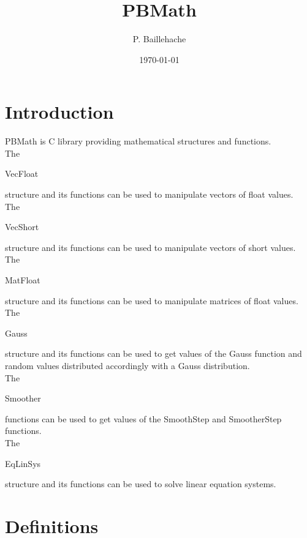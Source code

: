 \documentclass[12pt, a4paper]{article}
\begin{document}
\title{PBMath}
\author{P. Baillehache}
\date{\today}
\maketitle

\tableofcontents

\section*{Introduction}

PBMath is C library providing mathematical structures and functions.\\ 

The \begin{ttfamily}VecFloat\end{ttfamily} structure and its functions can be used to manipulate vectors of float values.\\

The \begin{ttfamily}VecShort\end{ttfamily} structure and its functions can be used to manipulate vectors of short values.\\

The \begin{ttfamily}MatFloat\end{ttfamily} structure and its functions can be used to manipulate matrices of float values.\\

The \begin{ttfamily}Gauss\end{ttfamily} structure and its functions can be used to get values of the Gauss function and random values distributed accordingly with a Gauss distribution.\\

The \begin{ttfamily}Smoother\end{ttfamily} functions can be used to get values of the SmoothStep and SmootherStep functions.\\

The \begin{ttfamily}EqLinSys\end{ttfamily} structure and its functions can be used to solve linear equation systems.\\

\section{Definitions}
\end{document}
